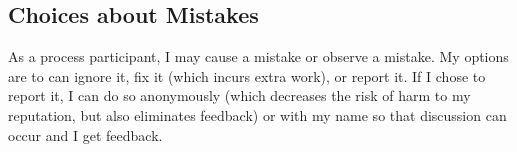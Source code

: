 \subsection*{Choices about Mistakes}
As a process participant, I may cause a mistake or observe a mistake. My options are to can ignore it, fix it (which incurs extra work), or report it. If I chose to report it, I can do so anonymously (which decreases the risk of harm to my reputation, but also eliminates feedback) or with my name so that discussion can occur and I get feedback.
